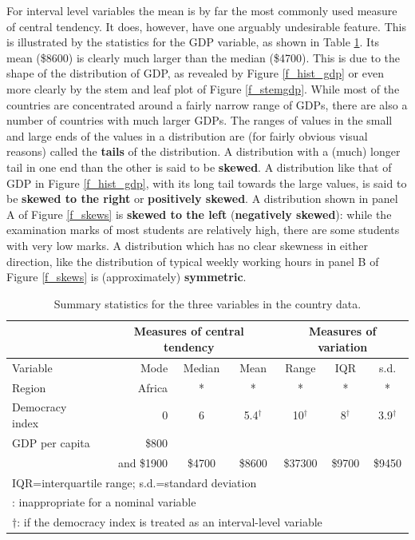 For interval level variables the mean is by far the most commonly
used measure of central tendency. It does, however, have one arguably
undesirable feature. This is illustrated by the statistics for the GDP
variable, as shown in Table \ref{t_countries_sums}. Its mean
(\$8600) is clearly much larger than the median (\$4700).
This is due to the shape of the distribution of
GDP, as revealed by Figure \ref{f_hist_gdp} or even more clearly by the
stem and leaf plot of Figure \ref{f_stemgdp}. While
most of the countries are concentrated around a fairly narrow range of
GDPs, there are also a number of countries with much larger GDPs. The
ranges of values in the small and large ends of the values in a
distribution are (for fairly obvious visual reasons) called the
\textbf{tails} of the distribution. A distribution with a (much) longer
tail in one end than the other is said to be \textbf{skewed}. A
distribution like that of GDP in Figure \ref{f_hist_gdp}, with its long
tail towards the large values, is said to be \textbf{skewed to the
right} or \textbf{positively skewed}. A distribution shown in panel A
of Figure \ref{f_skews} is \textbf{skewed to the left}
(\textbf{negatively skewed}): while the examination marks of most
students are relatively high, there are some students with very low
marks. A distribution which has no clear skewness
in either direction, like the
distribution of typical weekly working hours
in panel B of Figure \ref{f_skews} is
(approximately) \textbf{symmetric}.


\begin{table}
\caption{Summary statistics for the three variables in the country data.}
\label{t_countries_sums}
\begin{center}
\begin{tabular}{|l|rcc|ccc|}\hline
& \multicolumn{3}{|c|}{Measures of central tendency} &
\multicolumn{3}{|c|}{Measures of variation} \\ \hline
Variable & Mode & Median & Mean & Range & IQR & s.d. \\ \hline
Region & Africa & * & * & * & * & * \\[.5ex]
Democracy index & 0 & 6 & 5.4$^{\dagger}$ & 10$^{\dagger}$& 8$^{\dagger}$
& 3.9$^{\dagger}$\\[.5ex]
GDP per capita & \$800 & & & & & \\
 & and \$1900 & \$4700 & \$8600 & \$37300 & \$9700& \$9450\\
\hline
\multicolumn{7}{l}{\footnotesize IQR=interquartile range; s.d.=standard
deviation} \\
\multicolumn{7}{l}{\footnotesize *: inappropriate for a nominal
variable}\\
\multicolumn{7}{l}{\footnotesize $\dagger$: if the democracy index is
treated as an interval-level variable}
\end{tabular}
\end{center}
\end{table}


